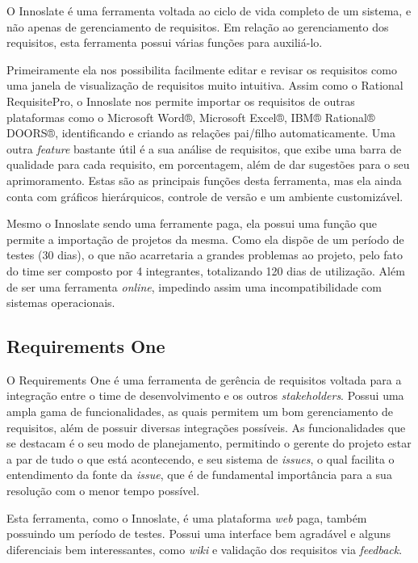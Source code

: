 O Innoslate é uma ferramenta voltada ao ciclo de vida completo de um sistema, e não apenas de gerenciamento de requisitos. Em relação ao gerenciamento dos requisitos, esta ferramenta possui várias funções para auxiliá-lo.

Primeiramente ela nos possibilita facilmente editar e revisar os requisitos como uma janela de visualização de requisitos muito intuitiva. Assim como o Rational RequisitePro, o Innoslate nos permite importar os requisitos de outras plataformas como o Microsoft Word®, Microsoft Excel®, IBM® Rational® DOORS®, identificando e criando as relações pai/filho automaticamente. Uma outra \textit{feature} bastante útil é a sua análise de requisitos, que exibe uma barra de qualidade para cada requisito, em porcentagem, além de dar sugestões para o seu aprimoramento. Estas são as principais funções desta ferramenta, mas ela ainda conta com gráficos hierárquicos, controle de versão e um ambiente customizável.

Mesmo o Innoslate sendo uma ferramente paga, ela possui uma função que permite a importação de projetos da mesma. Como ela dispõe de um período de testes (30 dias), o que não acarretaria a grandes problemas ao projeto, pelo fato do time ser composto por 4 integrantes, totalizando 120 dias de utilização. Além de ser uma ferramenta \textit{online}, impedindo assim uma incompatibilidade com sistemas operacionais.

\subsection{Requirements One}

O Requirements One é uma ferramenta de gerência de requisitos voltada para a integração entre o time de desenvolvimento e os outros \textit{stakeholders}. Possui uma ampla gama de funcionalidades, as quais permitem um bom gerenciamento de requisitos, além de possuir diversas integrações possíveis. As funcionalidades que se destacam é o seu modo de planejamento, permitindo o gerente do projeto estar a par de tudo o que está acontecendo, e seu sistema de \textit{issues}, o qual facilita o entendimento da fonte da \textit{issue}, que é de fundamental importância para a sua resolução com o menor tempo possível.

Esta ferramenta, como o Innoslate, é uma plataforma \textit{web} paga, também possuindo um período de testes. Possui uma interface bem agradável e alguns diferenciais bem interessantes, como \textit{wiki} e validação dos requisitos via \textit{feedback}. 

